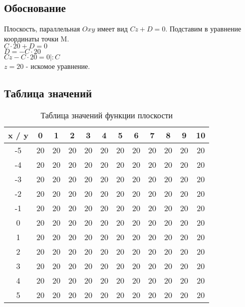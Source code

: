 \documentclass[a4paper, 12pt, oneside]{article}
\newcommand\labeltable[3] {
    \captionsetup{format=tablecaption}
    \begin{table}[H]
        \caption{#2}
        \begin{center}
            #1
        \end{center}
        \label{#3}
    \end{table}
}
\begin{document}
    \subsection{Обоснование}
    Плоскость, параллельная $Oxy$ имеет вид $Cz + D = 0$.
    Подставим в уравнение координаты точки M.\\
    $C \cdot 20 + D = 0$\\
    $D = -C \cdot 20$\\
    $Cz - C \cdot 20 = 0  | :C$\\
    $z = 20$ - искомое уравнение.

    \subsection{Таблица значений}
    \labeltable{
        \begin{tabular}{|c|c|c|c|c|c|c|c|c|c|c|c|}
            \hline
            x / y & 0  & 1  & 2  & 3  & 4  & 5  & 6  & 7  & 8  & 9  & 10 \\
            \hline
            -5    & 20 & 20 & 20 & 20 & 20 & 20 & 20 & 20 & 20 & 20 & 20 \\
            \hline
            -4    & 20 & 20 & 20 & 20 & 20 & 20 & 20 & 20 & 20 & 20 & 20 \\
            \hline
            -3    & 20 & 20 & 20 & 20 & 20 & 20 & 20 & 20 & 20 & 20 & 20 \\
            \hline
            -2    & 20 & 20 & 20 & 20 & 20 & 20 & 20 & 20 & 20 & 20 & 20 \\
            \hline
            -1    & 20 & 20 & 20 & 20 & 20 & 20 & 20 & 20 & 20 & 20 & 20 \\
            \hline
            0     & 20 & 20 & 20 & 20 & 20 & 20 & 20 & 20 & 20 & 20 & 20 \\
            \hline
            1     & 20 & 20 & 20 & 20 & 20 & 20 & 20 & 20 & 20 & 20 & 20 \\
            \hline
            2     & 20 & 20 & 20 & 20 & 20 & 20 & 20 & 20 & 20 & 20 & 20 \\
            \hline
            3     & 20 & 20 & 20 & 20 & 20 & 20 & 20 & 20 & 20 & 20 & 20 \\
            \hline
            4     & 20 & 20 & 20 & 20 & 20 & 20 & 20 & 20 & 20 & 20 & 20 \\
            \hline
            5     & 20 & 20 & 20 & 20 & 20 & 20 & 20 & 20 & 20 & 20 & 20 \\
            \hline
        \end{tabular}
    }{Таблица значений функции плоскости}{tab:task14-values-table}
\end{document}
